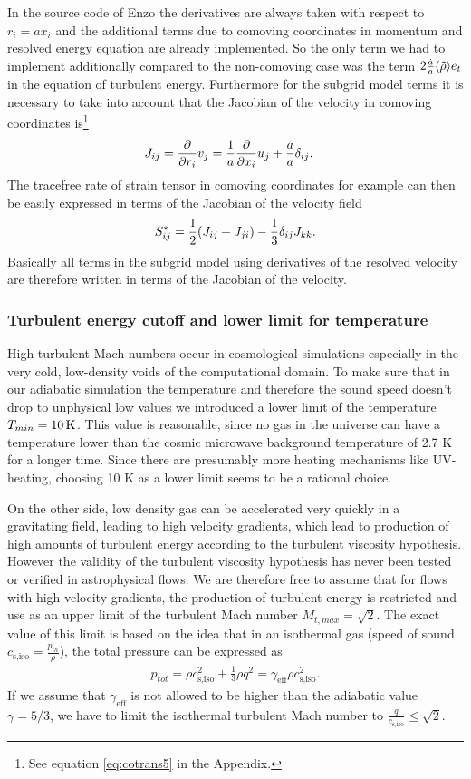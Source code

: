 In the source code of Enzo the derivatives are always taken with respect
to $r_i=a x_i$ and the additional terms due to comoving coordinates in 
momentum and resolved energy equation are already implemented. So the only term
we had to implement additionally compared to the non-comoving case was the term
$2\frac{\dot{a}}{a}\langle \tilde{\rho} \rangle e_t$ in the equation of turbulent energy. Furthermore
for the subgrid model terms it is necessary to take into account that
the Jacobian of the velocity in comoving coordinates is\footnote{See equation
\eqref{eq:cotrans5} in the Appendix.}
\begin{align}
J_{ij} = \frac{\partial}{\partial r_i}v_j&=\frac{1}{a}\frac{\partial}{\partial x_i}u_j + \frac{\dot{a}}{a}\delta_{ij}.
\end{align}
The tracefree rate of strain tensor in comoving coordinates for example can then
be easily expressed in terms of the Jacobian of the velocity field
\begin{align}
S^*_{ij}=\frac{1}{2}{ \left( J_{ij}+J_{ji} \right) }-\frac{1}{3}\delta_{ij}J_{kk}.
\end{align}
Basically all terms in the subgrid model using derivatives of the resolved
velocity are therefore written in terms of the Jacobian of the velocity.

\subsubsection{Turbulent energy cutoff and lower limit for temperature}
High turbulent Mach numbers occur in cosmological simulations especially in the
very cold, low-density voids of the computational domain. To make sure that in
our adiabatic simulation the temperature and therefore the sound speed doesn't
drop to unphysical low values we introduced a lower limit of the temperature
$T_{min}=\unit[10]{K}$. This value is reasonable, since no gas in the
universe can have a temperature lower than the cosmic microwave background
temperature of 2.7 K for a longer time. Since there are presumably more
heating mechanisms like UV-heating, choosing 10 K as a lower limit seems to be
a rational choice. 

On the other side, low density gas can be accelerated very quickly in a
gravitating field, leading to high velocity gradients, which lead to 
production of high amounts of turbulent energy according to the turbulent
viscosity hypothesis. However the validity of the turbulent viscosity
hypothesis has never been tested or verified in astrophysical
flows. We are therefore free to assume that for flows with high velocity
gradients, the production of turbulent energy is restricted and use as an
upper limit of the turbulent Mach number $M_{t,max}=\sqrt{2}$. The exact value
of this limit is based on the idea that in an isothermal gas (speed of sound 
$c_{\text{s,iso}} = \frac{p_{th}}{\rho}$), the total pressure can be expressed as
\begin{align}
p_{tot}=\rho c_{\text{s,iso}}^2 + \frac{1}{3}\rho q^2 = \gamma_{\text{eff}} \rho c_{\text{s,iso}}^2.
\end{align}
If we assume that $\gamma_{\text{eff}}$ is not allowed to be higher than the
adiabatic value $\gamma=5/3$, we have to limit the isothermal turbulent Mach number to
$\frac{q}{c_{\text{s,iso}}} \leq \sqrt{2}$.  

